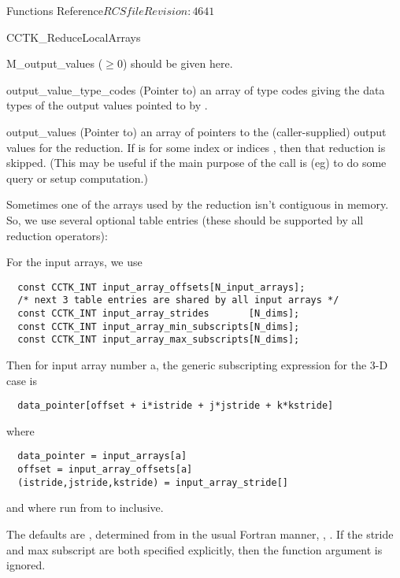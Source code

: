 \begin{cactuspart}{ Functions Reference}{$RCSfile$}{$Revision: 4641 $}
\begin{FunctionDescription}{CCTK\_ReduceLocalArrays}
\begin{ParameterSection}
\begin{Parameter}{M\_output\_values ($\ge 0$)}
should be given here.
\end{Parameter}
\begin{Parameter}{output\_value\_type\_codes}
(Pointer to) an array of     type
codes giving the data types of the output values pointed to by
.
\end{Parameter}
\begin{Parameter}{output\_values}
(Pointer to) an array of    pointers to the
(caller-supplied) output values for the reduction.
If   is  for some index or indices   ,
then that reduction is skipped.  (This may be useful if the main
purpose of the call is (eg) to do some query or setup computation.)
\end{Parameter}
\end{ParameterSection}

\begin{Discussion}
Sometimes one of the arrays used by the reduction isn't contiguous
in memory. So, we use several optional table entries
(these should be supported by all reduction operators):

For the input arrays, we use
\begin{verbatim}
  const CCTK_INT input_array_offsets[N_input_arrays];
  /* next 3 table entries are shared by all input arrays */
  const CCTK_INT input_array_strides       [N_dims];
  const CCTK_INT input_array_min_subscripts[N_dims];
  const CCTK_INT input_array_max_subscripts[N_dims];
\end{verbatim}

Then for input array number a, the generic subscripting expression for
the 3-D case is
\begin{verbatim}
  data_pointer[offset + i*istride + j*jstride + k*kstride]
\end{verbatim}
where
\begin{verbatim}
  data_pointer = input_arrays[a]
  offset = input_array_offsets[a]
  (istride,jstride,kstride) = input_array_stride[]
\end{verbatim}
and where  run from  to
 inclusive.

The defaults are , determined from
 in the usual Fortran manner,
,
.
 If the stride and max subscript are both specified explicitly, then the
 function argument is ignored.
\end{Discussion}


\end{FunctionDescription}
\end{cactuspart}
